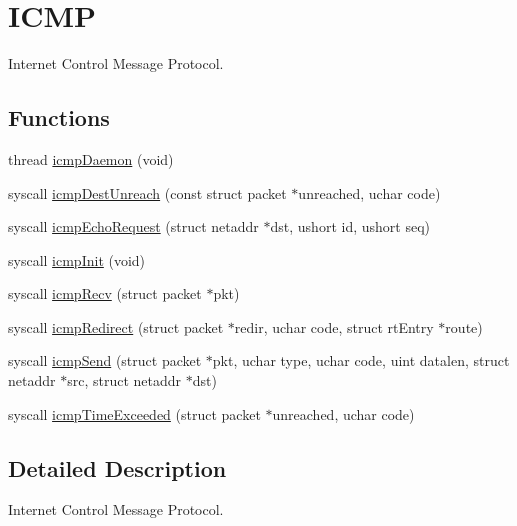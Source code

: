 \hypertarget{group__icmp}{\section{I\-C\-M\-P}
\label{group__icmp}
}


Internet Control Message Protocol.  


\subsection*{Functions}
\begin{DoxyCompactItemize}
\item 
thread \hyperlink{group__icmp_ga4ee2a49217ae9af4de18861a376a3732}{icmp\-Daemon} (void)
\item 
syscall \hyperlink{group__icmp_gaf4be4d9587ab78909263331887571260}{icmp\-Dest\-Unreach} (const struct packet $\ast$unreached, uchar code)
\item 
syscall \hyperlink{group__icmp_ga25e2245ca3ead5cb8ddf10e58a135bc9}{icmp\-Echo\-Request} (struct netaddr $\ast$dst, ushort id, ushort seq)
\item 
syscall \hyperlink{group__icmp_ga2293653d9624537154e5bc9297271e8c}{icmp\-Init} (void)
\item 
syscall \hyperlink{group__icmp_ga89fad9387e7cd00d430f8f0989c7178f}{icmp\-Recv} (struct packet $\ast$pkt)
\item 
syscall \hyperlink{group__icmp_gabd405f2f7ca3575084ab1a4fe11fdd03}{icmp\-Redirect} (struct packet $\ast$redir, uchar code, struct rt\-Entry $\ast$route)
\item 
syscall \hyperlink{group__icmp_ga9daa5ef5db7661f44e78aff72b5b76d4}{icmp\-Send} (struct packet $\ast$pkt, uchar type, uchar code, uint datalen, struct netaddr $\ast$src, struct netaddr $\ast$dst)
\item 
syscall \hyperlink{group__icmp_ga7b343aec5f2076fffec6141b499b731e}{icmp\-Time\-Exceeded} (struct packet $\ast$unreached, uchar code)
\end{DoxyCompactItemize}


\subsection{Detailed Description}
Internet Control Message Protocol. 

